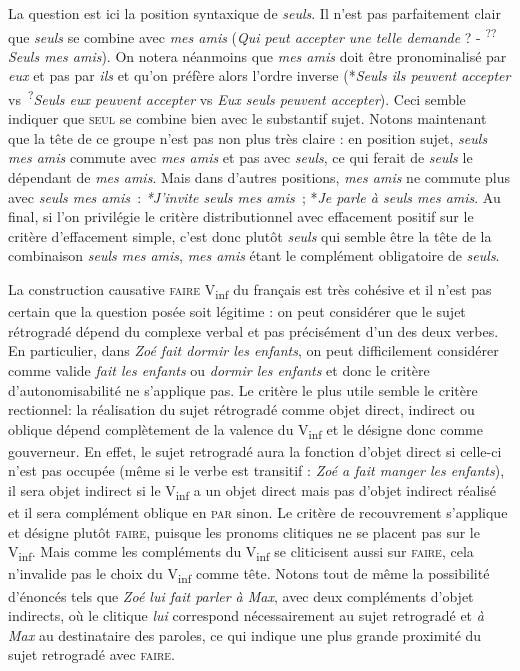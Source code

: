 {\begin{exe}
     La question est ici la position syntaxique de \textit{seuls}. Il n’est pas parfaitement clair que \textit{seuls} se combine avec \textit{mes amis} (\textit{Qui peut accepter une telle demande} ? - \textsuperscript{??}\textit{Seuls mes amis}). On notera néanmoins que \textit{mes amis} doit être pronominalisé par \textit{eux} et pas par \textit{ils} et qu’on préfère alors l’ordre inverse (*\textit{Seuls ils peuvent accepter} vs~\textsuperscript{?}\textit{Seuls eux peuvent accepter} vs \textit{Eux seuls peuvent accepter}). Ceci semble indiquer que \textsc{seul} se combine bien avec le substantif sujet. Notons maintenant que la tête de ce groupe n’est pas non plus très claire : en position sujet, \textit{seuls mes amis} commute avec \textit{mes amis} et pas avec \textit{seuls}, ce qui ferait de \textit{seuls} le dépendant de \textit{mes amis}. Mais dans d’autres positions, \textit{mes amis} ne commute plus avec \textit{seuls mes amis~}: \textit{*J’invite seuls mes amis~}; *\textit{Je parle à seuls mes amis}. Au final, si l’on privilégie le critère distributionnel avec effacement positif sur le critère d’effacement simple, c’est donc plutôt \textit{seuls} qui semble être la tête de la combinaison \textit{seuls mes amis}, \textit{mes amis} étant le complément obligatoire de \textit{seuls}.
    \end{exe}

     La construction causative \textsc{faire} V\textsubscript{inf} du français est très cohésive et il n’est pas certain que la question posée soit légitime : on peut considérer que le sujet rétrogradé dépend du complexe verbal et pas précisément d’un des deux verbes. En particulier, dans \textit{Zoé fait dormir les enfants}, on peut difficilement considérer comme valide \textit{fait les enfants} ou \textit{dormir les enfants} et donc le critère d’autonomisabilité ne s’applique pas. Le critère le plus utile semble le critère rectionnel: la réalisation du sujet rétrogradé comme objet direct, indirect ou oblique dépend complètement de la valence du V\textsubscript{inf} et le désigne donc comme gouverneur. En effet, le sujet retrogradé aura la fonction d’objet direct si celle-ci n’est pas occupée (même si le verbe est transitif : \textit{Zoé a fait manger les enfants}), il sera objet indirect si le V\textsubscript{inf} a un objet direct mais pas d’objet indirect réalisé et il sera complément oblique en \textsc{par} sinon. Le critère de recouvrement s’applique et désigne plutôt \textsc{faire}, puisque les pronoms clitiques ne se placent pas sur le V\textsubscript{inf}. Mais comme les compléments du V\textsubscript{inf} se cliticisent aussi sur \textsc{faire}, cela n’invalide pas le choix du V\textsubscript{inf} comme tête. Notons tout de même la possibilité d'énoncés tels que \textit{Zoé lui fait parler à Max}, avec deux compléments d'objet indirects, où
    le clitique \textit{lui} correspond nécessairement au sujet retrogradé et \textit{à Max} au destinataire des paroles, ce qui indique une plus grande proximité du sujet retrogradé avec \textsc{faire}.

}
